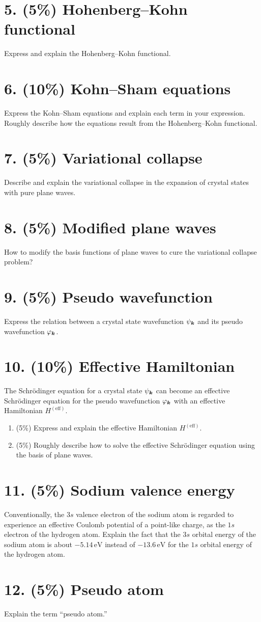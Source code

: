 \section*{5. (5\%) Hohenberg--Kohn functional}
Express and explain the Hohenberg--Kohn functional.

\section*{6. (10\%) Kohn--Sham equations}
Express the Kohn--Sham equations and explain each term in your expression. Roughly describe how the equations result from the Hohenberg--Kohn functional.

\section*{7. (5\%) Variational collapse}
Describe and explain the variational collapse in the expansion of crystal states with pure plane waves.

\section*{8. (5\%) Modified plane waves}
How to modify the basis functions of plane waves to cure the variational collapse problem?

\section*{9. (5\%) Pseudo wavefunction}
Express the relation between a crystal state wavefunction $\psi_{\boldsymbol{k}}$ and its pseudo wavefunction $\varphi_{\boldsymbol{k}}$.

\section*{10. (10\%) Effective Hamiltonian}
The Schrödinger equation for a crystal state $\psi_{\boldsymbol{k}}$ can become an effective Schrödinger equation for the pseudo wavefunction $\varphi_{\boldsymbol{k}}$ with an effective Hamiltonian $H^{(\mathrm{eff})}$.
\begin{enumerate}[label=(\alph*)]
\item (5\%) Express and explain the effective Hamiltonian $H^{(\mathrm{eff})}$.
\item (5\%) Roughly describe how to solve the effective Schrödinger equation using the basis of plane waves.
\end{enumerate}

\section*{11. (5\%) Sodium valence energy}
Conventionally, the $3s$ valence electron of the sodium atom is regarded to experience an effective Coulomb potential of a point-like charge, as the $1s$ electron of the hydrogen atom. Explain the fact that the $3s$ orbital energy of the sodium atom is about $-5.14\,\mathrm{eV}$ instead of $-13.6\,\mathrm{eV}$ for the $1s$ orbital energy of the hydrogen atom.

\section*{12. (5\%) Pseudo atom}
Explain the term ``pseudo atom.''
